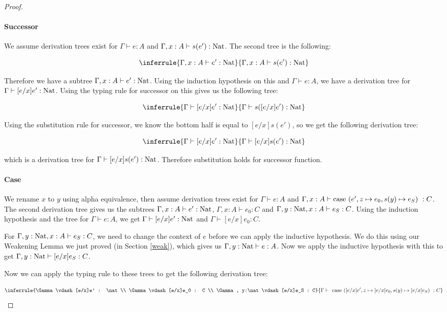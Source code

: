 \begin{proof}
\paragraph{Successor} We assume derivation trees exist for $\Gamma \vdash e : A$ and $\Gamma, x:A \vdash s(e') : \operatorname{Nat}$. The second tree is the following:

$$\inferrule{\Gamma, x:A \vdash e' : \nat}{\Gamma, x:A \vdash s(e') : \nat}$$

Therefore we have a subtree $\Gamma, x:A \vdash e' : \operatorname{Nat}$. Using the induction hypothesis on this and $\Gamma \vdash e : A$, we have a derivation tree for $\Gamma \vdash [e/x]e' : \operatorname{Nat}$. Using the typing rule for successor on this gives us the following tree:

$$\inferrule{\Gamma \vdash [e/x]e' : \nat}{\Gamma \vdash s([e/x]e') : \nat}$$

Using the substitution rule for successor, we know the bottom half is equal to $[e/x]s(e')$, so we get the following derivation tree:

 $$\inferrule{\Gamma \vdash [e/x]e' : \nat}{\Gamma \vdash [e/x]s(e') : \nat}$$
 
which is a derivation tree for $\Gamma \vdash [e/x]s(e') : \operatorname{Nat}$. Therefore substitution holds for successor function.

\paragraph{Case} We rename $x$ to $y$ using alpha equivalence, then assume derivation trees exist for $\Gamma \vdash e : A$ and $\Gamma, x: A \vdash \operatorname{case} \ (e', z \mapsto e_0 , s(y) \mapsto e_S) \  : C$. The second derivation tree gives us the subtrees $\Gamma, x:A \vdash e' : \operatorname{Nat}$, $\Gamma, x : A \vdash e_0 : C$ and $\Gamma, y: \operatorname{Nat}, x : A \vdash e_S : C$. Using the induction hypothesis and the tree for $\Gamma \vdash e : A$, we get  $\Gamma \vdash [e/x]e' : \operatorname{Nat}$ and $\Gamma \vdash [e/x]e_0 : C$.

For $\Gamma, y:\operatorname{Nat}, x : A \vdash e_S : C$, we need  to change the context of $e$ before we can apply the inductive hypothesis. We do this using our  Weakening Lemma we just proved (in Section \ref{weak}), which gives us $\Gamma, y:\operatorname{Nat} \vdash e : A$. Now we apply the inductive hypothesis with this to get $\Gamma, y:\operatorname{Nat} \vdash [e/x]e_S : C$.
 
 
Now we can apply the typing rule to these trees to get the following derivation tree:

$$\inferrule{\Gamma \vdash [e/x]e' : \nat \\  \Gamma \vdash [e/x]e_0 : C \\  \Gamma , y:\nat \vdash [e/x]e_S : C}  {\Gamma \vdash \ \case \ ([e/x]e', z \mapsto [e/x]e_0 , s(y) \mapsto [e/x]e_S) \  : C}  
$$


\end{proof}
